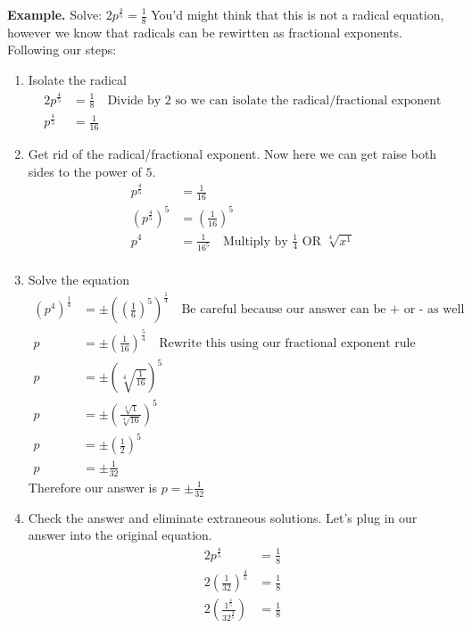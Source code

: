 \textbf{Example.} Solve: $2p^{\frac{4}{5}} = \frac{1}{8}$
You'd might think that this is not a radical equation, however we know that radicals can be rewirtten as fractional exponents. 
Following our steps: 
\begin{enumerate}
    \item Isolate the radical
    \begin{align*}
        2p^{\frac{4}{5}} &= \frac{1}{8} \quad \text{Divide by 2 so we can isolate the radical/fractional exponent} \\
        p^{\frac{4}{5}} &= \frac{1}{16} 
    \end{align*}
    \item Get rid of the radical/fractional exponent.
    Now here we can get raise both sides to the power of $5$. 
    \begin{align*}
        p^{\frac{4}{5}} &= \frac{1}{16} \\
        (p^{\frac{4}{5}})^5 &= \left(\frac{1}{16}\right)^5 \\
        p^4 &= \frac{1}{16^5} \quad \text{Multiply by $\frac{1}{4}$ OR $\sqrt[4]{x^1}$} \\
    \end{align*}
    \item Solve the equation
    \begin{align*}
        (p^4)^{\frac{1}{4}} &= \pm \left(\left(\frac{1}{6}\right)^5\right)^{\frac{1}{4}} \quad \text{Be careful because our answer can be + or - as well} \\ 
        p &= \pm \left(\frac{1}{16}\right)^{\frac{5}{4}} \quad \text{Rewrite this using our fractional exponent rule} \\
        p &= \pm  \left(\sqrt[4]{\frac{1}{16}}\right)^5 \\
        p &= \pm \left(\frac{\sqrt[4]{1}}{\sqrt[4]{16}}\right)^5 \\
        p &= \pm \left(\frac{1}{2}\right)^5 \\
        p &= \pm \frac{1}{32} 
    \end{align*}
    Therefore our answer is $p=\pm \frac{1}{32}$
    \item Check the answer and eliminate extraneous solutions. Let's plug in our answer into the original equation.
    \begin{align*}
        2p^{\frac{4}{5}} &= \frac{1}{8} \\
        2\left(\frac{1}{32}\right)^{\frac{4}{5}} &= \frac{1}{8} \\
        2\left(\frac{1^{\frac{4}{5}}}{32^{\frac{4}{5}}}\right) &= \frac{1}{8} \\

\end{align*}
\end{enumerate}
